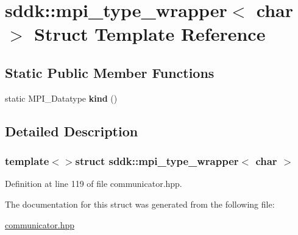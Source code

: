 \hypertarget{structsddk_1_1mpi__type__wrapper_3_01char_01_4}{}\section{sddk\+:\+:mpi\+\_\+type\+\_\+wrapper$<$ char $>$ Struct Template Reference}
\label{structsddk_1_1mpi__type__wrapper_3_01char_01_4}
\subsection*{Static Public Member Functions}
\begin{DoxyCompactItemize}
\item 
\hypertarget{structsddk_1_1mpi__type__wrapper_3_01char_01_4_a65c553d223fa9de77066b8194d7f7fbe}{}static M\+P\+I\+\_\+\+Datatype {\bfseries kind} ()\label{structsddk_1_1mpi__type__wrapper_3_01char_01_4_a65c553d223fa9de77066b8194d7f7fbe}

\end{DoxyCompactItemize}


\subsection{Detailed Description}
\subsubsection*{template$<$$>$struct sddk\+::mpi\+\_\+type\+\_\+wrapper$<$ char $>$}



Definition at line 119 of file communicator.\+hpp.



The documentation for this struct was generated from the following file\+:\begin{DoxyCompactItemize}
\item 
\hyperlink{communicator_8hpp}{communicator.\+hpp}\end{DoxyCompactItemize}
